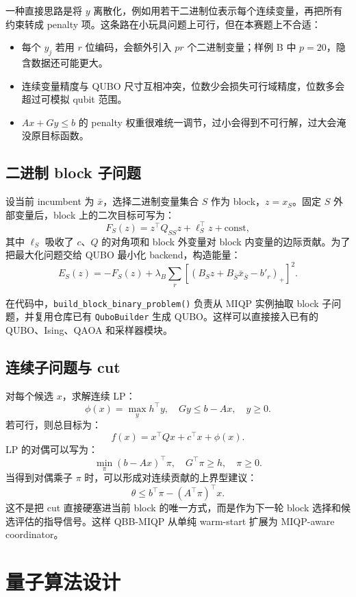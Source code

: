\documentclass[UTF8,a4paper,11pt]{ctexart}
\begin{document}
一种直接思路是将 $y$ 离散化，例如用若干二进制位表示每个连续变量，再把所有约束转成 penalty 项。这条路在小玩具问题上可行，但在本赛题上不合适：

\begin{itemize}
  \item 每个 $y_j$ 若用 $r$ 位编码，会额外引入 $pr$ 个二进制变量；样例 B 中 $p=20$，隐含数据还可能更大。
  \item 连续变量精度与 QUBO 尺寸互相冲突，位数少会损失可行域精度，位数多会超过可模拟 qubit 范围。
  \item $Ax+Gy\le b$ 的 penalty 权重很难统一调节，过小会得到不可行解，过大会淹没原目标函数。
\end{itemize}

\subsection{二进制 block 子问题}

设当前 incumbent 为 $\bar{x}$，选择二进制变量集合 $S$ 作为 block，$z=x_S$。固定 $S$ 外部变量后，block 上的二次目标可写为：
\[
F_S(z)=z^\top Q_{SS}z+\ell_S^\top z+\text{const},
\]
其中 $\ell_S$ 吸收了 $c$、$Q$ 的对角项和 block 外变量对 block 内变量的边际贡献。为了把最大化问题交给 QUBO 最小化 backend，构造能量：
\[
E_S(z)=-F_S(z)+\lambda_B\sum_r \left[\left(B_Sz+B_{\bar{S}}\bar{x}_{\bar{S}}-b'_r\right)_+\right]^2.
\]

在代码中，\texttt{build\_block\_binary\_problem()} 负责从 MIQP 实例抽取 block 子问题，并复用仓库已有 \texttt{QuboBuilder} 生成 QUBO。这样可以直接接入已有的 QUBO、Ising、QAOA 和采样器模块。

\subsection{连续子问题与 cut}

对每个候选 $x$，求解连续 LP：
\[
\phi(x)=\max_y h^\top y,\quad Gy\le b-Ax,\quad y\ge 0.
\]
若可行，则总目标为：
\[
f(x)=x^\top Qx+c^\top x+\phi(x).
\]
LP 的对偶可以写为：
\[
\min_\pi (b-Ax)^\top \pi,\quad G^\top \pi\ge h,\quad \pi\ge 0.
\]
当得到对偶乘子 $\pi$ 时，可以形成对连续贡献的上界型建议：
\[
\theta \le b^\top\pi-(A^\top\pi)^\top x.
\]
这不是把 cut 直接硬塞进当前 block 的唯一方式，而是作为下一轮 block 选择和候选评估的指导信号。这样 QBB-MIQP 从单纯 warm-start 扩展为 MIQP-aware coordinator。

\section{量子算法设计}
\end{document}
